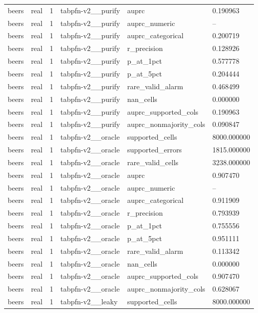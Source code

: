 \begin{tabular}{llllll}
beers & real & 1 & tabpfn-v2\_\_purify & auprc & 0.190963 \\
beers & real & 1 & tabpfn-v2\_\_purify & auprc\_numeric & -- \\
beers & real & 1 & tabpfn-v2\_\_purify & auprc\_categorical & 0.200719 \\
beers & real & 1 & tabpfn-v2\_\_purify & r\_precision & 0.128926 \\
beers & real & 1 & tabpfn-v2\_\_purify & p\_at\_1pct & 0.577778 \\
beers & real & 1 & tabpfn-v2\_\_purify & p\_at\_5pct & 0.204444 \\
beers & real & 1 & tabpfn-v2\_\_purify & rare\_valid\_alarm & 0.468499 \\
beers & real & 1 & tabpfn-v2\_\_purify & nan\_cells & 0.000000 \\
beers & real & 1 & tabpfn-v2\_\_purify & auprc\_supported\_cols & 0.190963 \\
beers & real & 1 & tabpfn-v2\_\_purify & auprc\_nonmajority\_cols & 0.090847 \\
beers & real & 1 & tabpfn-v2\_\_oracle & supported\_cells & 8000.000000 \\
beers & real & 1 & tabpfn-v2\_\_oracle & supported\_errors & 1815.000000 \\
beers & real & 1 & tabpfn-v2\_\_oracle & rare\_valid\_cells & 3238.000000 \\
beers & real & 1 & tabpfn-v2\_\_oracle & auprc & 0.907470 \\
beers & real & 1 & tabpfn-v2\_\_oracle & auprc\_numeric & -- \\
beers & real & 1 & tabpfn-v2\_\_oracle & auprc\_categorical & 0.911909 \\
beers & real & 1 & tabpfn-v2\_\_oracle & r\_precision & 0.793939 \\
beers & real & 1 & tabpfn-v2\_\_oracle & p\_at\_1pct & 0.755556 \\
beers & real & 1 & tabpfn-v2\_\_oracle & p\_at\_5pct & 0.951111 \\
beers & real & 1 & tabpfn-v2\_\_oracle & rare\_valid\_alarm & 0.113342 \\
beers & real & 1 & tabpfn-v2\_\_oracle & nan\_cells & 0.000000 \\
beers & real & 1 & tabpfn-v2\_\_oracle & auprc\_supported\_cols & 0.907470 \\
beers & real & 1 & tabpfn-v2\_\_oracle & auprc\_nonmajority\_cols & 0.628067 \\
beers & real & 1 & tabpfn-v2\_\_leaky & supported\_cells & 8000.000000 \\

\end{tabular}
